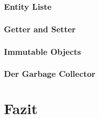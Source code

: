 		\subsubsection{Entity Liste}
		\subsubsection{Getter and Setter}
		\subsubsection{Immutable Objects}
		\subsubsection{Der Garbage Collector}
\section{Fazit}